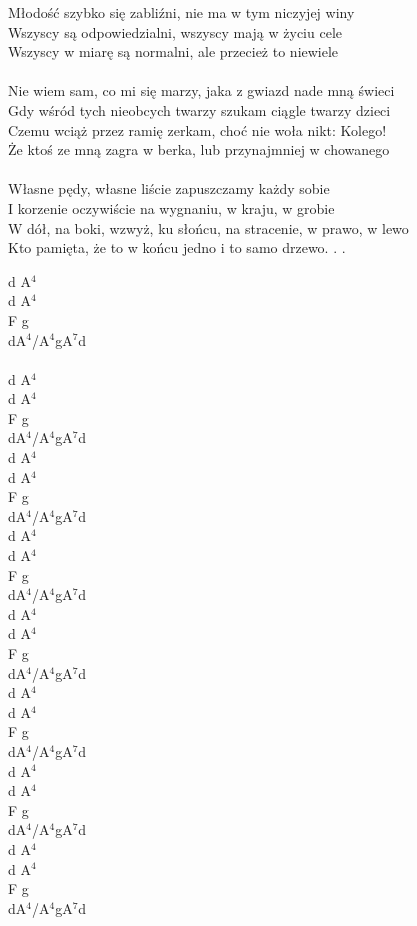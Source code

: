 \documentclass[a5paper, 10pt]{book}
\begin{document}
\begin{minipage}[t]{0.85\textwidth}
Młodość szybko się zabliźni, nie ma w tym niczyjej winy\\
Wszyscy są odpowiedzialni, wszyscy mają w życiu cele\\
Wszyscy w miarę są normalni, ale przecież to niewiele \\
\\
Nie wiem sam, co mi się marzy, jaka z gwiazd nade mną świeci\\
Gdy wśród tych nieobcych twarzy szukam ciągle twarzy dzieci\\
Czemu wciąż przez ramię zerkam, choć nie woła nikt: Kolego!\\
Że ktoś ze mną zagra w berka, lub przynajmniej w chowanego \\
\\
Własne pędy, własne liście zapuszczamy każdy sobie\\
I korzenie oczywiście na wygnaniu, w kraju, w grobie\\
W dół, na boki, wzwyż, ku słońcu, na stracenie, w prawo, w lewo\\
Kto pamięta, że to w końcu jedno i to samo drzewo. . . \\
\end{minipage}
\begin{minipage}[t]{0.15\textwidth}
d A$^4$\\
d A$^4$\\
F g\\
dA$^4$/A$^4$gA$^7$d\\
\\
d A$^4$\\
d A$^4$\\
F g\\
dA$^4$/A$^4$gA$^7$d\\

d A$^4$\\
d A$^4$\\
F g\\
dA$^4$/A$^4$gA$^7$d\\

d A$^4$\\
d A$^4$\\
F g\\
dA$^4$/A$^4$gA$^7$d\\

d A$^4$\\
d A$^4$\\
F g\\
dA$^4$/A$^4$gA$^7$d\\

d A$^4$\\
d A$^4$\\
F g\\
dA$^4$/A$^4$gA$^7$d\\

d A$^4$\\
d A$^4$\\
F g\\
dA$^4$/A$^4$gA$^7$d\\

d A$^4$\\
d A$^4$\\
F g\\
dA$^4$/A$^4$gA$^7$d\\
\end{minipage}
\end{document}
